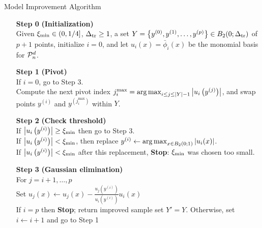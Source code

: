 \documentclass{article}
\begin{document}
{
\begin{fullwidth}[leftmargin=0in, rightmargin=0in, width=\linewidth-0.5in]
\begin{flushleft}

\begin{algorithm}[H]
    \caption{Model Improvement Algorithm \label{alg:model_improvement} }
    \label{model_improving_algorithm}
    \begin{itemize}
        \item[\textbf{Step 0}] \textbf{(Initialization)} \\
            Given $\xi_{\text{min}} \in (0,1/4]$, $\Delta_{\textrm{tr}} \ge 1$, a set $Y = \left\{y^{(0)}, y^{(1)}, \ldots, y^{(p)}\right\} \in B_2(0;\Delta_{\textrm{tr}})$ of $p+1$ points,
            initialize $i=0$, and let $u_i(x)= \bar \phi_i(x)$ be the monomial basis for $\mathcal{P}^d_n$.
		\item[\textbf{Step 1}] \textbf{(Pivot)} \\
			If $i = 0$, go to Step 3. \\
			Compute the next pivot index $j^{\textrm{max}}_i = \operatorname*{arg\,max}_{i \le j \le |Y|-1} \left|u_i\left(y^{(j)}\right)\right|$,
			and swap points $y^{(i)}$ and $y^{(j^{\textrm{max}}_i)}$ within $Y$.
			
        \item[\textbf{Step 2}] \textbf{(Check threshold)} \\
                If $\left|u_i\left(y^{(i)}\right)\right| \ge \xi_{\text{min}}$ then go to Step 3. \\
                If $\left|u_i\left(y^{(i)}\right)\right| < \xi_{\text{min}}$, then replace $y^{(i)} \gets \operatorname*{arg\,max}_{x \in B_2\left(0; 1 \right)}\left|u_i(x)\right|$. \\
				If $\left|u_i\left(y^{(i)}\right)\right| < \xi_{\text{min}}$ after this replacement,  \textbf{Stop}: $\xi_{\text{min}}$ was chosen too small.
        \item[\textbf{Step 3}] \textbf{(Gaussian elimination)} \\
        	For $j = i+1, \ldots, p$ \\
        	\hspace{2em} Set $u_j(x) \gets u_j(x) - \frac{u_j\left(y^{(i)}\right)}{u_i\left(y^{(i)}\right)} u_i(x)$ \\
            If $i = p$ then \textbf{Stop}; return improved sample set $Y'=Y$.  Otherwise,  set $i \gets i+1$ and go to Step 1
    \end{itemize}
\end{algorithm}

\end{flushleft}
\end{fullwidth}
}
\end{document}
